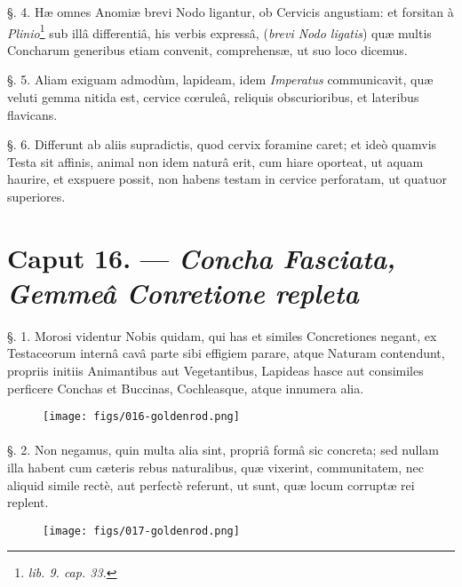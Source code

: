 \documentclass[a4paper, 11pt, oneside, polutonikogreek, german]{article}
\begin{document}
§. 4. Hæ omnes Anomiæ brevi Nodo ligantur, ob Cervicis angustiam: et forsitan à \emph{Plinio}\footnote{\emph{lib. 9. cap. 33.}} sub illâ differentiâ, his verbis expressâ, (\emph{brevi Nodo ligatis}) quæ multis Concharum generibus etiam convenit, comprehensæ, ut suo loco dicemus.

§. 5. Aliam exiguam admodùm, lapideam, idem \emph{Imperatus} communicavit, quæ veluti gemma nitida est, cervice cœruleâ, reliquis obscurioribus, et lateribus flavicans.

§. 6. Differunt ab aliis supradictis, quod cervix foramine caret; et ideò quamvis Testa sit affinis, animal non idem naturâ erit, cum hiare oporteat, ut aquam haurire, et exspuere possit, non habens testam in cervice perforatam, ut quatuor superiores.

\section{Caput 16. --- \emph{Concha Fasciata, Gemmeâ Conretione repleta}}
\paragraph{}
§. 1. Morosi videntur Nobis quidam, qui has et similes Concretiones negant, ex Testaceorum internâ cavâ parte sibi effigiem parare, atque Naturam contendunt, propriis initiis Animantibus aut Vegetantibus, Lapideas hasce aut consimiles perficere Conchas et Buccinas, Cochleasque, atque innumera alia.

\begin{figure}[H]
\centering
\texttt{[image: figs/016-goldenrod.png]}

\end{figure}
\paragraph{}
§. 2. Non negamus, quin multa alia sint, propriâ formâ sic concreta; sed nullam illa habent cum cæteris rebus naturalibus, quæ vixerint, communitatem, nec aliquid simile rectè, aut perfectè referunt, ut sunt, quæ locum corruptæ rei replent.

\begin{figure}[H]
\centering
\texttt{[image: figs/017-goldenrod.png]}

\end{figure}
\end{document}
